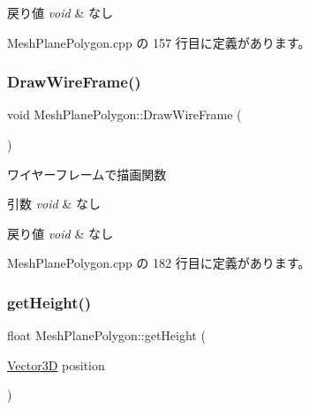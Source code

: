 \begin{DoxyRetVals}{戻り値}
{\em void} & なし \\
\hline
\end{DoxyRetVals}


 Mesh\+Plane\+Polygon.\+cpp の 157 行目に定義があります。

\mbox{\label{class_mesh_plane_polygon_a9e932c0b166ef6458405f4514081d227}} 
\subsubsection{\texorpdfstring{Draw\+Wire\+Frame()}{DrawWireFrame()}}
{\footnotesize\ttfamily void Mesh\+Plane\+Polygon\+::\+Draw\+Wire\+Frame (\begin{DoxyParamCaption}{ }\end{DoxyParamCaption})}



ワイヤーフレームで描画関数 


\begin{DoxyParams}{引数}
{\em void} & なし \\
\hline
\end{DoxyParams}

\begin{DoxyRetVals}{戻り値}
{\em void} & なし \\
\hline
\end{DoxyRetVals}


 Mesh\+Plane\+Polygon.\+cpp の 182 行目に定義があります。

\mbox{\label{class_mesh_plane_polygon_af5340ac623c506777b3bb41dbecf2a53}} 
\subsubsection{\texorpdfstring{get\+Height()}{getHeight()}}
{\footnotesize\ttfamily float Mesh\+Plane\+Polygon\+::get\+Height (\begin{DoxyParamCaption}\item[{\mbox{\hyperlink{class_vector3_d}{Vector3D}}}]{position }\end{DoxyParamCaption})}



